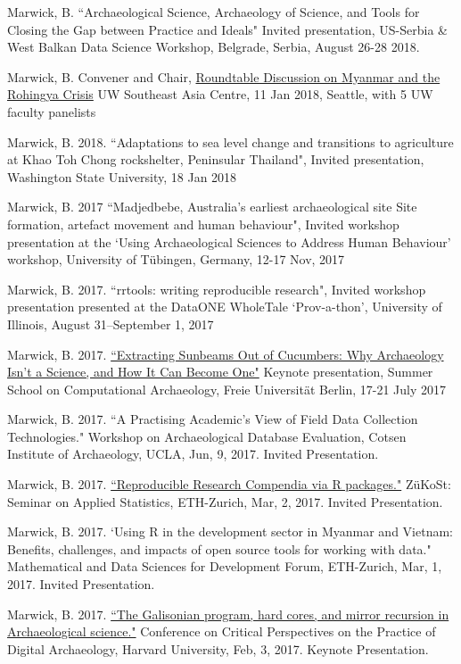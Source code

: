 \ind Marwick, B. ``Archaeological Science, Archaeology of Science, and Tools for Closing the Gap between Practice and Ideals" Invited presentation, US-Serbia \& West Balkan Data Science Workshop, Belgrade, Serbia, August 26-28 2018.

\ind Marwick, B. Convener and Chair, \href{https://jsis.washington.edu/seac/news/roundtable-discussion-myanmar-rohingya-crisis-2/}{Roundtable Discussion on Myanmar and the Rohingya Crisis} UW Southeast Asia Centre, 11 Jan 2018, Seattle, with 5 UW faculty panelists

\ind Marwick, B. 2018. ``Adaptations to sea level change and transitions to agriculture at Khao Toh Chong rockshelter, Peninsular Thailand", Invited presentation, Washington State University, 18 Jan 2018

\ind Marwick, B. 2017 ``Madjedbebe, Australia's earliest archaeological site Site formation, artefact movement and human behaviour", Invited workshop presentation at the ‘Using Archaeological Sciences to Address Human Behaviour’ workshop, University of Tübingen, Germany, 12-17 Nov, 2017

\ind Marwick, B. 2017. ``rrtools: writing reproducible research", Invited workshop presentation presented at the DataONE WholeTale ‘Prov-a-thon’, University of Illinois, August 31–September 1, 2017

\ind Marwick, B. 2017. \href{https://github.com/benmarwick/berlinsummerschoolkeynote}{``Extracting Sunbeams Out of Cucumbers: Why Archaeology Isn't a Science, and How It Can Become One"} Keynote presentation, Summer School on Computational Archaeology, Freie Universität Berlin, 17-21 July 2017

\ind Marwick, B. 2017. ``A Practising Academic’s View of Field Data Collection Technologies." Workshop on Archaeological Database Evaluation, Cotsen Institute of Archaeology, UCLA,  Jun, 9, 2017. Invited Presentation.

\ind Marwick, B. 2017. \href{https://github.com/benmarwick/ETH-Zurich-ZuKoSt-Reproducible-Research-Compendia-via-R-packages}{``Reproducible Research Compendia via R packages."} ZüKoSt: Seminar on Applied Statistics, ETH-Zurich,  Mar, 2, 2017. Invited Presentation.

\ind Marwick, B. 2017. `Using R in the development sector in Myanmar and Vietnam: Benefits, challenges, and impacts of open source tools for working with data." Mathematical and Data Sciences for Development Forum, ETH-Zurich,  Mar, 1, 2017. Invited Presentation.

\ind Marwick, B. 2017. \href{https://www.youtube.com/watch?v=k3Wv4Cnr0Nc}{``The Galisonian program, hard cores, and mirror recursion in Archaeological science."} Conference on Critical Perspectives on the Practice of Digital Archaeology, Harvard University,  Feb, 3, 2017. Keynote Presentation.

